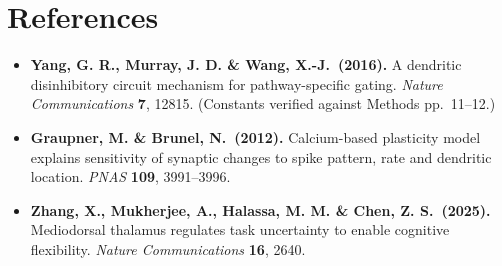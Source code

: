 \documentclass[11pt,a4paper]{article}
\begin{document}
\section*{References}
\begin{itemize}
    \item \textbf{Yang, G. R., Murray, J. D. \& Wang, X.-J.\ (2016).} A dendritic
      disinhibitory circuit mechanism for pathway-specific gating. \textit{Nature
      Communications} \textbf{7}, 12815. (Constants verified against Methods pp.~11--12.)
    \item \textbf{Graupner, M. \& Brunel, N.\ (2012).} Calcium-based plasticity model
      explains sensitivity of synaptic changes to spike pattern, rate and dendritic
      location. \textit{PNAS} \textbf{109}, 3991--3996.
    \item \textbf{Zhang, X., Mukherjee, A., Halassa, M. M. \& Chen, Z. S.\ (2025).}
      Mediodorsal thalamus regulates task uncertainty to enable cognitive flexibility.
      \textit{Nature Communications} \textbf{16}, 2640.
\end{itemize}
\end{document}
